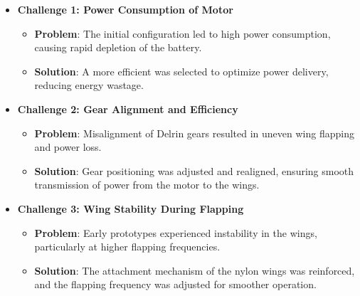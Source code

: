 \begin{itemize}
    \item \textbf{Challenge 1: Power Consumption of \bldc Motor}
    \begin{itemize}
        \item \textbf{Problem}: The initial configuration led to high power consumption, causing rapid depletion of the \lipo battery.
        \item \textbf{Solution}: A more efficient \esc was selected to optimize power delivery, reducing energy wastage.
    \end{itemize}
    
    \item \textbf{Challenge 2: Gear Alignment and Efficiency}
    \begin{itemize}
        \item \textbf{Problem}: Misalignment of Delrin gears resulted in uneven wing flapping and power loss.
        \item \textbf{Solution}: Gear positioning was adjusted and realigned, ensuring smooth transmission of power from the motor to the wings.
    \end{itemize}
    
    \item \textbf{Challenge 3: Wing Stability During Flapping}
    \begin{itemize}
        \item \textbf{Problem}: Early prototypes experienced instability in the wings, particularly at higher flapping frequencies.
        \item \textbf{Solution}: The attachment mechanism of the nylon wings was reinforced, and the flapping frequency was adjusted for smoother operation.
    \end{itemize}
\end{itemize}